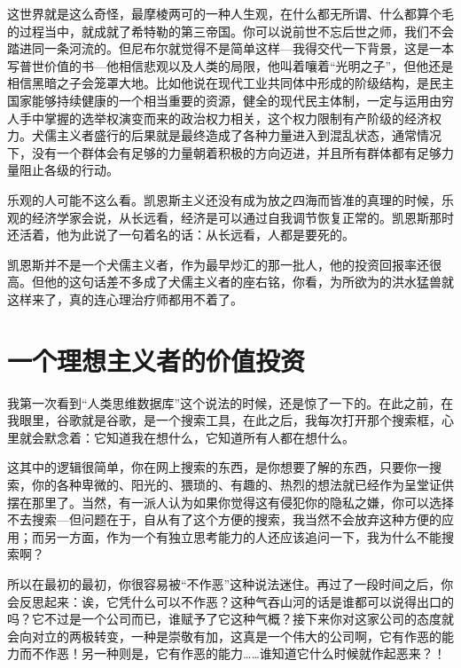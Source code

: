 这世界就是这么奇怪，最摩棱两可的一种人生观，在什么都无所谓、什么都算个毛的过程当中，就成就了希特勒的第三帝国。你可以说前世不忘后世之师，我们不会踏进同一条河流的。但尼布尔就觉得不是简单这样---我得交代一下背景，这是一本写普世价值的书---他相信悲观以及人类的局限，他叫着嚷着``光明之子''，但他还是相信黑暗之子会笼罩大地。比如他说在现代工业共同体中形成的阶级结构，是民主国家能够持续健康的一个相当重要的资源，健全的现代民主体制，一定与运用由穷人手中掌握的选举权演变而来的政治权力相关，这个权力限制有产阶级的经济权力。犬儒主义者盛行的后果就是最终造成了各种力量进入到混乱状态，通常情况下，没有一个群体会有足够的力量朝着积极的方向迈进，并且所有群体都有足够力量阻止各级的行动。

乐观的人可能不这么看。凯恩斯主义还没有成为放之四海而皆准的真理的时候，乐观的经济学家会说，从长远看，经济是可以通过自我调节恢复正常的。凯恩斯那时还活着，他为此说了一句着名的话：从长远看，人都是要死的。

凯恩斯并不是一个犬儒主义者，作为最早炒汇的那一批人，他的投资回报率还很高。但他的这句话差不多成了犬儒主义者的座右铭，你看，为所欲为的洪水猛兽就这样来了，真的连心理治疗师都用不着了。

\section{一个理想主义者的价值投资}

我第一次看到``人类思维数据库''这个说法的时候，还是惊了一下的。在此之前，在我眼里，谷歌就是谷歌，是一个搜索工具，在此之后，我每次打开那个搜索框，心里就会默念着：它知道我在想什么，它知道所有人都在想什么。

这其中的逻辑很简单，你在网上搜索的东西，是你想要了解的东西，只要你一搜索，你的各种卑微的、阳光的、猥琐的、有趣的、热烈的想法就已经作为呈堂证供摆在那里了。当然，有一派人认为如果你觉得这有侵犯你的隐私之嫌，你可以选择不去搜索---但问题在于，自从有了这个方便的搜索，我当然不会放弃这种方便的应用；而另一方面，作为一个有独立思考能力的人还应该追问一下，我为什么不能搜索啊？

所以在最初的最初，你很容易被``不作恶''这种说法迷住。再过了一段时间之后，你会反思起来：诶，它凭什么可以不作恶？这种气吞山河的话是谁都可以说得出口的吗？它不过是一个公司而已，谁赋予了它这种气概？接下来你对这家公司的态度就会向对立的两极转变，一种是崇敬有加，这真是一个伟大的公司啊，它有作恶的能力而不作恶！另一种则是，它有作恶的能力\ldots{}\ldots{}谁知道它什么时候就作起恶来？！

